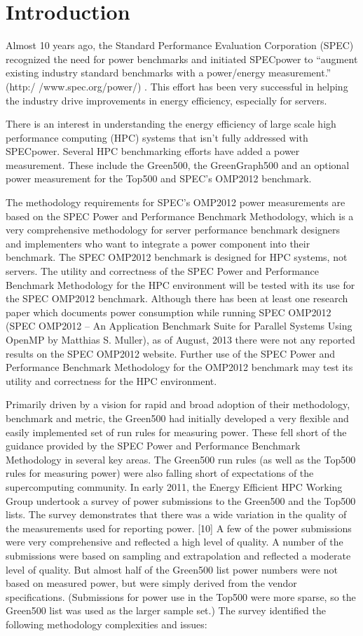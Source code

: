 \section{Introduction}
\label{sec:intro}
Almost 10 years ago, the Standard Performance Evaluation Corporation (SPEC)
recognized the need for power benchmarks and initiated SPECpower to ``augment
existing industry standard benchmarks with a power/energy measurement.''
(http:/ /www.spec.org/power/) . This effort has been very successful in
helping the industry drive improvements in energy efficiency, especially for
servers.

There is an interest in understanding the energy efficiency of large scale
high performance computing (HPC) systems that isn't fully addressed with
SPECpower. Several HPC benchmarking efforts have added a power measurement.
These include the Green500, the GreenGraph500 and an optional power
measurement for the Top500 and SPEC's OMP2012 benchmark.

The methodology requirements for SPEC's OMP2012 power measurements are based
on the SPEC Power and Performance Benchmark Methodology, which is a very
comprehensive methodology for server performance benchmark designers and
implementers who want to integrate a power component into their benchmark.
The SPEC OMP2012 benchmark is designed for HPC systems, not servers. The
utility and correctness of the SPEC Power and Performance Benchmark
Methodology for the HPC environment will be tested with its use for the SPEC
OMP2012 benchmark. Although there has been at least one research paper which
documents power consumption while running SPEC OMP2012 (SPEC OMP2012 -- An
Application Benchmark Suite for Parallel Systems Using OpenMP by Matthias S.
Muller), as of August, 2013 there were not any reported results on the SPEC
OMP2012 website. Further use of the SPEC Power and Performance Benchmark
Methodology for the OMP2012 benchmark may test its utility and correctness for
the HPC environment.

Primarily driven by a vision for rapid and broad adoption of their
methodology, benchmark and metric, the Green500 had initially developed a very
flexible and easily implemented set of run rules for measuring power. These
fell short of the guidance provided by the SPEC Power and Performance
Benchmark Methodology in several key areas. The Green500 run rules (as well
as the Top500 rules for measuring power) were also falling short of
expectations of the supercomputing community. In early 2011, the Energy
Efficient HPC Working Group undertook a survey of power submissions to the
Green500 and the Top500 lists. The survey demonstrates that there was a wide
variation in the quality of the measurements used for reporting power. [10] A
few of the power submissions were very comprehensive and reflected a high
level of quality. A number of the submissions were based on sampling and
extrapolation and reflected a moderate level of quality. But almost half of
the Green500 list power numbers were not based on measured power, but were
simply derived from the vendor specifications. (Submissions for power use in
the Top500 were more sparse, so the Green500 list was used as the larger
sample set.) The survey identified the following methodology complexities and
issues:

